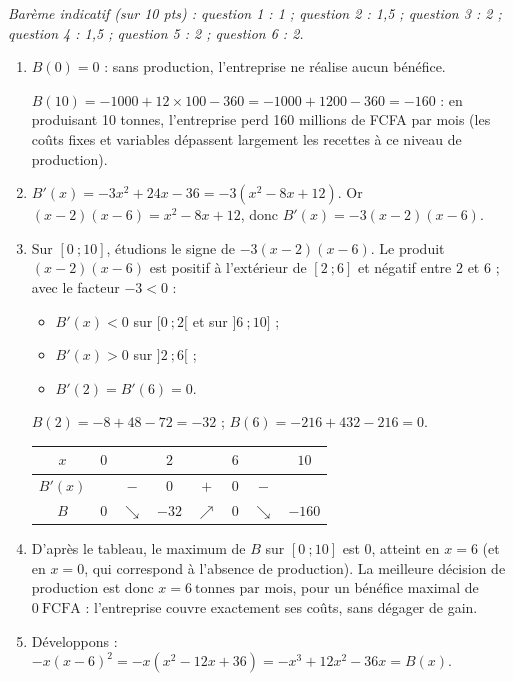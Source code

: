 \documentclass[11pt]{article}
\begin{document}
\begin{corrige}
\emph{Barème indicatif (sur 10 pts) : question 1 : 1 ; question 2 : 1,5 ; question 3 : 2 ; question 4 : 1,5 ; question 5 : 2 ; question 6 : 2.}

\begin{enumerate}
\item $B(0) = 0$ : sans production, l'entreprise ne réalise aucun bénéfice.

$B(10) = -1000 + 12 \times 100 - 360 = -1000 + 1200 - 360 = -160$ : en produisant 10 tonnes, l'entreprise perd 160 millions de FCFA par mois (les coûts fixes et variables dépassent largement les recettes à ce niveau de production).
\item $B'(x) = -3x^2 + 24x - 36 = -3(x^2 - 8x + 12)$. Or $(x-2)(x-6) = x^2 - 8x + 12$, donc $B'(x) = -3(x-2)(x-6)$.
\item Sur $[0\ ; 10]$, étudions le signe de $-3(x-2)(x-6)$. Le produit $(x-2)(x-6)$ est positif à l'extérieur de $[2\ ; 6]$ et négatif entre $2$ et $6$ ; avec le facteur $-3 < 0$ :
\begin{itemize}
\item $B'(x) < 0$ sur $[0\ ; 2[$ et sur $]6\ ; 10]$ ;
\item $B'(x) > 0$ sur $]2\ ; 6[$ ;
\item $B'(2) = B'(6) = 0$.
\end{itemize}
$B(2) = -8 + 48 - 72 = -32$ ; $B(6) = -216 + 432 - 216 = 0$.
\begin{center}
\begin{tabular}{|c|ccccccc|}\hline
$x$ & $0$ & & $2$ & & $6$ & & $10$ \\ \hline
$B'(x)$ & & $-$ & $0$ & $+$ & $0$ & $-$ & \\ \hline
$B$ & $0$ & $\searrow$ & $-32$ & $\nearrow$ & $0$ & $\searrow$ & $-160$ \\ \hline
\end{tabular}
\end{center}
\item D'après le tableau, le maximum de $B$ sur $[0\ ; 10]$ est $0$, atteint en $x = 6$ (et en $x = 0$, qui correspond à l'absence de production). La meilleure décision de production est donc $\boxed{x = 6\ \text{tonnes par mois}}$, pour un bénéfice maximal de $\boxed{0\ \text{FCFA}}$ : l'entreprise couvre exactement ses coûts, sans dégager de gain.
\item Développons : $-x(x-6)^2 = -x(x^2 - 12x + 36) = -x^3 + 12x^2 - 36x = B(x)$.


\end{enumerate}
\end{corrige}
\end{document}
